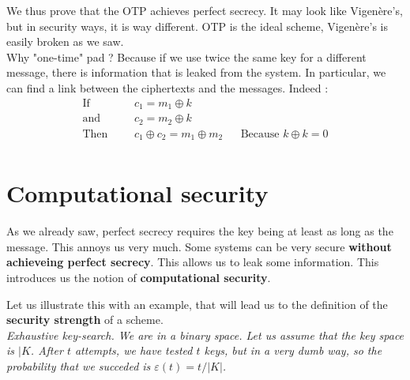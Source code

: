 \documentclass[a4paper, 12pt]{book}
\begin{document}
We thus prove that the OTP achieves perfect secrecy. It may look like Vigenère's, but in security ways, it is way different. OTP is the ideal scheme, Vigenère's is easily broken as we saw. \\

Why "one-time" pad ? Because if we use twice the same key for a different message, there is information that is leaked from the system. In particular, we can find a link between the ciphertexts and the messages. Indeed :
\begin{align*}
    \text{If} &&& c_1 = m_1 \oplus k \\
    \text{and} &&& c_2 = m_2 \oplus k \\
    \text{Then} &&& c_1 \oplus c_2 = m_1\oplus m_2 && \text{Because $k\oplus k = 0$} \\
\end{align*}

\section{Computational security}
As we already saw, perfect secrecy requires the key being at least as long as the message. This annoys us very much. Some systems can be very secure \textbf{without achieveing perfect secrecy}. This allows us to leak some information. This introduces us the notion of \textbf{computational security}. \\


Let us illustrate this with an example, that will lead us to the definition of the \textbf{security strength} of a scheme. \\

\textit{Exhaustive key-search. We are in a binary space. Let us assume that the key space is $|K$. After $t$ attempts, we have tested $t$ keys, but in a very dumb way, so the probability that we succeded is $\varepsilon(t) = t/|K|$.
}
\end{document}
